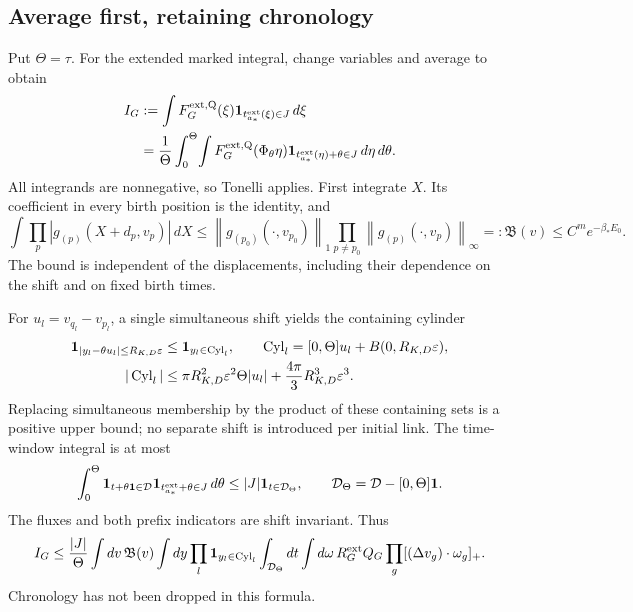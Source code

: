\documentclass[11pt]{article}
\newcommand{\eps}{\varepsilon}
\newcommand{\ind}{\mathbf1}
\newcommand{\dd}{\,d}
\newcommand{\norm}[1]{\left\|#1\right\|}
\newcommand{\Cyl}{\operatorname{Cyl}}
\theoremstyle{definition}\newtheorem{definition}[theorem]{Definition}
\theoremstyle{remark}\newtheorem{remark}[theorem]{Remark}
\numberwithin{equation}{section}
\begin{document}
\subsection{Average first, retaining chronology}\label{subsec:average}
Put $\Theta=\tau$. For the extended marked integral, change variables and
average to obtain
\begin{align}
 I_G&:=\int F_G^{\rm ext,Q}(\xi)
                     \ind_{t_{a_*}^{\rm ext}(\xi)\in J}\dd\xi\notag\\
 &=\frac1\Theta\int_0^\Theta\!\int
     F_G^{\rm ext,Q}(\Phi_\theta\eta)
           \ind_{t_{a_*}^{\rm ext}(\eta)+\theta\in J}\dd\eta\dd\theta.
       \label{eq:average}
\end{align}
All integrands are nonnegative, so Tonelli applies. First integrate $X$.
Its coefficient in every birth position is the identity, and
\begin{equation}\label{eq:spatial}
 \int\prod_p|g_{(p)}(X+d_p,v_p)|\dd X
 \le\norm{g_{(p_0)}(\cdot,v_{p_0})}_1
         \prod_{p\ne p_0}\norm{g_{(p)}(\cdot,v_p)}_\infty
 =:\mathfrak B(v)\le C^m e^{-\beta_*E_0}.
\end{equation}
The bound is independent of the displacements, including their dependence
on the shift and on fixed birth times.

For $u_l=v_{q_l}-v_{p_l}$, a single simultaneous shift yields the containing
cylinder
\begin{align}
 \ind_{|y_l-\theta u_l|\le R_{K,D}\eps}
 &\le\ind_{y_l\in\Cyl_l},\qquad
 \Cyl_l=[0,\Theta]u_l+B(0,R_{K,D}\eps),\notag\\
 |\Cyl_l|&\le\pi R_{K,D}^2\eps^2\Theta|u_l|
                    +\frac{4\pi}3R_{K,D}^3\eps^3.
       \label{eq:cylinder}
\end{align}
Replacing simultaneous membership by the product of these containing sets
is a positive upper bound; no separate shift is introduced per initial link.
The time-window integral is at most
\[
 \int_0^\Theta\ind_{t+\theta\mathbf1\in\mathcal D}
          \ind_{t_{a_*}^{\rm ext}+\theta\in J}\dd\theta
 \le |J|\ind_{t\in\mathcal D_\Theta},\qquad
 \mathcal D_\Theta=\mathcal D-[0,\Theta]\mathbf1.
\]
The fluxes and both prefix indicators are shift invariant. Thus
\begin{align}
 I_G\le\frac{|J|}{\Theta}\int dv\,\mathfrak B(v)
  \int dy\prod_l\ind_{y_l\in\Cyl_l}
  \int_{\mathcal D_\Theta}dt\int d\omega\,
          R_G^{\rm ext}Q_G\prod_g[(\Delta v_g)\cdot\omega_g]_+.
       \label{eq:W1}
\end{align}
Chronology has not been dropped in this formula.
\end{document}
